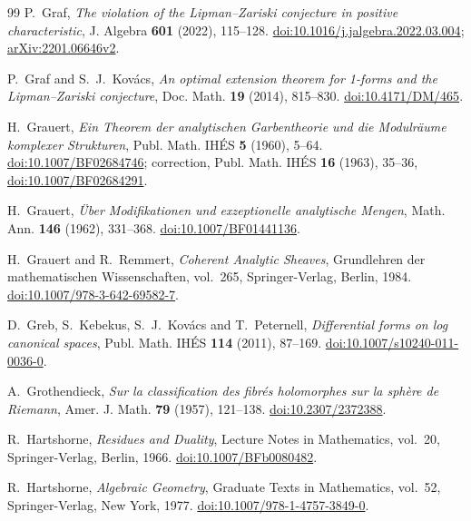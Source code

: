 \begin{thebibliography}{99}
P.~Graf,
\emph{The violation of the Lipman--Zariski conjecture in positive characteristic},
J. Algebra \textbf{601} (2022), 115--128.
\href{https://doi.org/10.1016/j.jalgebra.2022.03.004}{doi:10.1016/j.jalgebra.2022.03.004};
\href{https://arxiv.org/abs/2201.06646v2}{arXiv:2201.06646v2}.

P.~Graf and S.~J.~Kov\'acs,
\emph{An optimal extension theorem for 1-forms and the Lipman--Zariski conjecture},
Doc. Math. \textbf{19} (2014), 815--830.
\href{https://doi.org/10.4171/DM/465}{doi:10.4171/DM/465}.

H.~Grauert,
\emph{Ein Theorem der analytischen Garbentheorie und die Modulr\"aume komplexer Strukturen},
Publ. Math. IH\'ES \textbf{5} (1960), 5--64.
\href{https://doi.org/10.1007/BF02684746}{doi:10.1007/BF02684746};
correction, Publ. Math. IH\'ES \textbf{16} (1963), 35--36,
\href{https://doi.org/10.1007/BF02684291}{doi:10.1007/BF02684291}.

H.~Grauert,
\emph{\"Uber Modifikationen und exzeptionelle analytische Mengen},
Math. Ann. \textbf{146} (1962), 331--368.
\href{https://doi.org/10.1007/BF01441136}{doi:10.1007/BF01441136}.

H.~Grauert and R.~Remmert,
\emph{Coherent Analytic Sheaves},
Grundlehren der mathematischen Wissenschaften, vol.~265,
Springer-Verlag, Berlin, 1984.
\href{https://doi.org/10.1007/978-3-642-69582-7}{doi:10.1007/978-3-642-69582-7}.

D.~Greb, S.~Kebekus, S.~J.~Kov\'acs and T.~Peternell,
\emph{Differential forms on log canonical spaces},
Publ. Math. IH\'ES \textbf{114} (2011), 87--169.
\href{https://doi.org/10.1007/s10240-011-0036-0}{doi:10.1007/s10240-011-0036-0}.

A.~Grothendieck,
\emph{Sur la classification des fibr\'es holomorphes sur la sph\`ere de Riemann},
Amer. J. Math. \textbf{79} (1957), 121--138.
\href{https://doi.org/10.2307/2372388}{doi:10.2307/2372388}.

R.~Hartshorne,
\emph{Residues and Duality},
Lecture Notes in Mathematics, vol.~20,
Springer-Verlag, Berlin, 1966.
\href{https://doi.org/10.1007/BFb0080482}{doi:10.1007/BFb0080482}.

R.~Hartshorne,
\emph{Algebraic Geometry},
Graduate Texts in Mathematics, vol.~52,
Springer-Verlag, New York, 1977.
\href{https://doi.org/10.1007/978-1-4757-3849-0}{doi:10.1007/978-1-4757-3849-0}.


\end{thebibliography}
